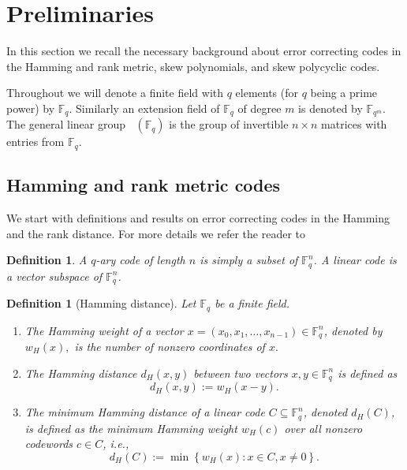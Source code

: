 \documentclass[12pt,paper]{article}
\theoremstyle{plain}
\newtheorem{definition}[theorem]{Definition}
\newcommand{\Fq}{\mathbb{F}_{q}}
\DeclareMathOperator{\GL}{GL_{n}}
\begin{document}
\section{Preliminaries}
In this section we recall the necessary background about error correcting codes in the Hamming and rank metric, skew polynomials, and skew polycyclic codes.

Throughout we will denote a finite field with $q$ elements (for $q$ being a prime power) by $\Fq$. Similarly an extension field of $\Fq$ of degree $m$ is denoted by $\mathbb F_{q^m}$.  The general linear group $\GL(\mathbb{F}_{q}) $ is the group of invertible $n\times n$ matrices with entries from $\mathbb{F}_{q}$.




 
\subsection{Hamming and rank metric codes}

We start with definitions and results on error correcting codes in the Hamming and the rank distance. For more details  we refer the reader to \cite{augot2018generalized,gabidulin2025rank,Gabidulin1985,Huffman2003} 

\begin{definition}
      A $q$-ary \emph{code} of length $n$ is simply a subset of $\Fq^n$. A \emph{linear code} is a vector subspace of $\Fq^n$.
  \end{definition}

  \begin{definition}[Hamming distance]
  Let  $\Fq$  be a finite field.
  \begin{enumerate}
       \item The \emph{Hamming weight} of a vector $x=(x_0,x_1,\ldots, x_{n-1})\in \Fq^n$,  denoted by $  w_{H}(x),$ is the number of  nonzero coordinates of $x.$
       \item The \emph{Hamming distance} $d_H(x,y)$ between two vectors $x,y \in \Fq^n$ is defined as 
       $$ d_H(x,y):=w_H(x-y) .$$
\item  The   \emph{minimum Hamming distance} of a linear code $C\subseteq \Fq^n$, denoted $ d_H(C)$, is defined as the minimum Hamming weight $w_H(c)$ over all nonzero codewords $c \in C$, i.e.,
$$
d_{H}(C):=\min \left\{w_H(x): x \in C, x \neq 0\right\} .
$$
  \end{enumerate}
  \end{definition}
\end{document}
